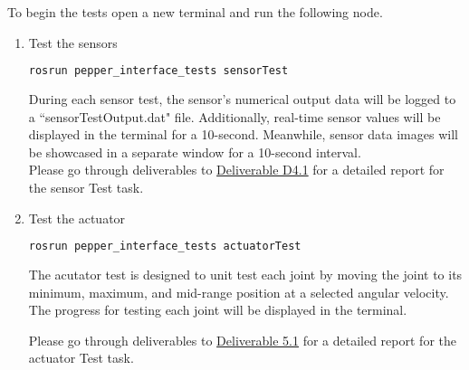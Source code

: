 \documentclass{CSSRforAfrica}
\begin{document}
{		\noindent To begin the tests open a new terminal and run the following node.
		\begin{enumerate}
			
			\item Test the sensors
			\begin{lstlisting}[style=withoutNumbering, language=bash]
			rosrun pepper_interface_tests sensorTest
			\end{lstlisting}
			During each sensor test, the sensor's numerical output data will be logged to a ``sensorTestOutput.dat" file. Additionally, real-time sensor values will be displayed in the terminal for a 10-second. Meanwhile, sensor data images will be showcased in a separate window for a 10-second interval.\\
			
			Please go through deliverables to \href{https://cssr4africa.github.io/deliverables/CSSR4Africa_Deliverable_D4.1.pdf}
			{Deliverable D4.1} for a detailed report for the sensor Test task.
			
			\item Test the actuator
			\begin{lstlisting}[style=withoutNumbering, language=bash]
			rosrun pepper_interface_tests actuatorTest
			\end{lstlisting}
			
			The acutator test is designed to unit test each joint by moving the joint to its minimum, maximum, and mid-range position at a selected angular velocity. The progress for testing each joint will be displayed in the terminal. 
			
			Please go through deliverables to \href{https://cssr4africa.github.io/deliverables/CSSR4Africa_Deliverable_D5.1.pdf}
			{Deliverable 5.1} for a detailed report for the actuator Test task.
			
		\end{enumerate}
		
		\newpage
		
		
		\newpage
		
}
\end{document}
